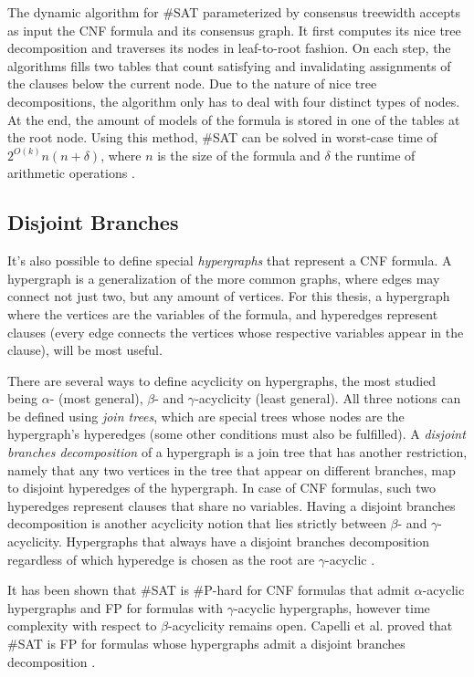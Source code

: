 \documentclass{article}
\begin{document}
The dynamic algorithm for \#SAT parameterized by consensus treewidth accepts as input the CNF formula and its consensus graph.
It first computes its nice tree decomposition and traverses its nodes in leaf-to-root fashion.
On each step, the algorithms fills two tables that count satisfying and invalidating assignments of the clauses below the current node.
Due to the nature of nice tree decompositions, the algorithm only has to deal with  four distinct types of nodes.
At the end, the amount of models of the formula is stored in one of the tables at the root node.
Using this method, \#SAT can be solved in worst-case time of $2^{O(k)} n(n+\delta)$, where $n$ is the size of the formula and $\delta$ the runtime of arithmetic operations \cite{DBLP:conf/sat/GanianS17}.

\subsection{Disjoint Branches}

It's also possible to define special {\em hypergraphs} that represent a CNF formula.
A hypergraph is a generalization of the more common graphs, where edges may connect not just two, but any amount of vertices.
For this thesis, a hypergraph where the vertices are the variables of the formula, and hyperedges represent clauses (every edge connects the vertices whose respective variables appear in the clause), will be most useful.

There are several ways to define acyclicity on hypergraphs, the most studied being $\alpha$- (most general), $\beta$- and $\gamma$-acyclicity (least general).
All three notions can be defined using {\em join trees}, which are special trees whose nodes are the hypergraph's hyperedges (some other conditions must also be fulfilled).
A {\em disjoint branches decomposition} of a hypergraph is a join tree that has another restriction, namely that any two vertices in the tree that appear on different branches, map to disjoint hyperedges of the hypergraph.
In case of CNF formulas, such two hyperedges represent clauses that share no variables.
Having a disjoint branches decomposition is another acyclicity notion that lies strictly between $\beta$- and $\gamma$-acyclicity.
Hypergraphs that always have a disjoint branches decomposition regardless of which hyperedge is chosen as the root are $\gamma$-acyclic \cite{DBLP:conf/sat/CapelliDM14}.

It has been shown that \#SAT is \#P-hard for CNF formulas that admit $\alpha$-acyclic hypergraphs and FP for formulas with $\gamma$-acyclic hypergraphs, however time complexity with respect to $\beta$-acyclicity remains open.
Capelli et al. proved that \#SAT is FP for formulas whose hypergraphs admit a disjoint branches decomposition \cite{DBLP:conf/sat/CapelliDM14}.
\end{document}
